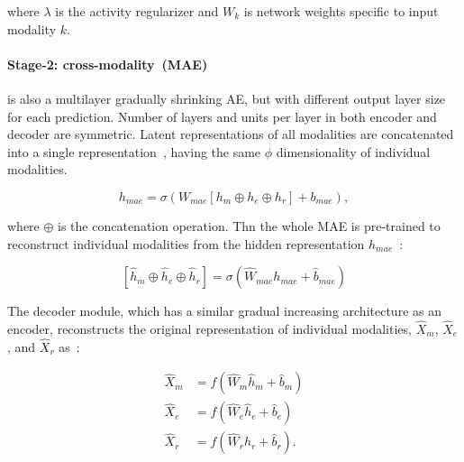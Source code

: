 \hspace*{3.5mm} where $\lambda$ is the activity regularizer and $W_{k}$ is network weights specific to input modality $k$. 

\paragraph{Stage-2: cross-modality~(MAE)}\noindent is also a multilayer gradually shrinking AE, but with different output layer size for each prediction. Number of layers and units per layer in both encoder and decoder are symmetric. Latent representations of all modalities are concatenated into a single representation~\cite{liu2016multimodal}, having the same $\phi$ dimensionality of individual modalities. 

\begin{equation}
    h_{mae}=\sigma\left(W_{mae}\left[h_{m} \oplus h_{e} \oplus h_{r}\right]+b_{mae}\right),
\end{equation}

\hspace*{3.5mm} where $\oplus$ is the concatenation operation. Thn the whole MAE is pre-trained to reconstruct individual modalities from the hidden representation $h_{mae}$~\cite{liu2016multimodal}:

\begin{equation}
    \left[\hat{h}_{m}\oplus \hat{h}_{e} \oplus \hat{h}_{r}
    \right]=\sigma\left(\hat W_{mae} h_{mae}+\hat {b}_{mae}\right)
\end{equation}

\hspace*{3.5mm} The decoder module, which has a similar gradual increasing architecture as an encoder, reconstructs the original representation of individual modalities, $\hat{X}_{m}$, $\hat{X}_{e}$, and $\hat{X}_{r}$ as~\cite{wang2018associativemulti}: 

\begin{equation}
    \begin{aligned}
        \hat{X}_{m} &=f\left(\hat W_{m} \hat{h}_{m}+\hat{b}_{m}\right) \\
        \hat{X}_{e} &=f\left(\hat W_{e} \hat{h}_{e}+\hat{b}_{e}\right) \\
        \hat{X}_{r} &=f\left(\hat W_{r} \hat{h}_{r}+\hat{b}_{r}\right).
        \end{aligned}
\end{equation}

